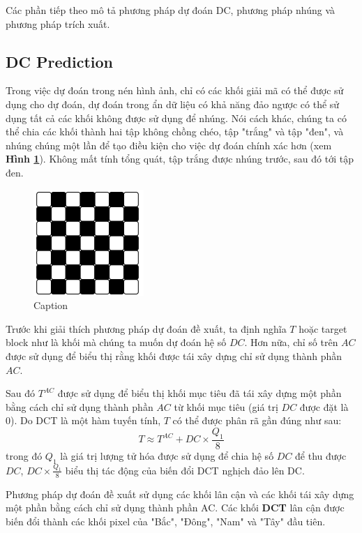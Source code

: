 Các phần tiếp theo mô tả phương pháp dự đoán DC, phương pháp nhúng và phương pháp trích xuất. 

\subsection{DC Prediction}

Trong việc dự đoán trong nén hình ảnh, chỉ có các khối giải mã có thể được sử dụng cho dự đoán, dự đoán trong ẩn dữ liệu có khả năng đảo ngược có thể sử dụng tất cả các khối không được sử dụng để nhúng. Nói cách khác, chúng ta có thể chia các khối thành hai tập không chồng chéo, tập "trắng" và tập "đen", và nhúng chúng một lần để tạo điều kiện cho việc dự đoán chính xác hơn (xem \textbf{Hình \ref{fig:chap2-DCT-block}}). Không mất tính tổng quát, tập trắng được nhúng trước, sau đó tới tập đen. 

\begin{figure}
    \centering
    \includegraphics{graphics/chapter-2/chap2-DCT-block.png}
    \caption{Caption}
    \label{fig:chap2-DCT-block}
\end{figure}

Trước khi giải thích phương pháp dự đoán đề xuất, ta định nghĩa $T$ hoặc target block như là khối mà chúng ta muốn dự đoán hệ số $DC$. Hơn nữa, chỉ số trên $AC$ được sử dụng để biểu thị rằng khối được tái xây dựng chỉ sử dụng thành phần $AC$.

Sau đó $T^{AC}$ được sử dụng để biểu thị khối mục tiêu đã tái xây dựng một phần bằng cách chỉ sử dụng thành phần $AC$ từ khối mục tiêu (giá trị $DC$ được đặt là 0). Do DCT là một hàm tuyến tính, $T$ có thể được phân rã gần đúng như sau: 
\begin{equation}
\label{eq:chap2-DCT}
T \approx T^{AC} + DC \times \frac{Q_1}{8}
\end{equation}
trong đó $Q_1$  là giá trị lượng tử hóa được sử dụng để chia hệ số $DC$ để thu được $DC$, $DC \times \frac{Q_1}{8}$ biểu thị tác động của biến đổi DCT nghịch đảo lên DC.

Phương pháp dự đoán đề xuất sử dụng các khối lân cận và các khối tái xây dựng một phần bằng cách chỉ sử dụng thành phần AC. Các khối \textbf{DCT} lân cận được biến đổi thành các khối pixel của "Bắc", "Đông", "Nam" và "Tây" đầu tiên. 

